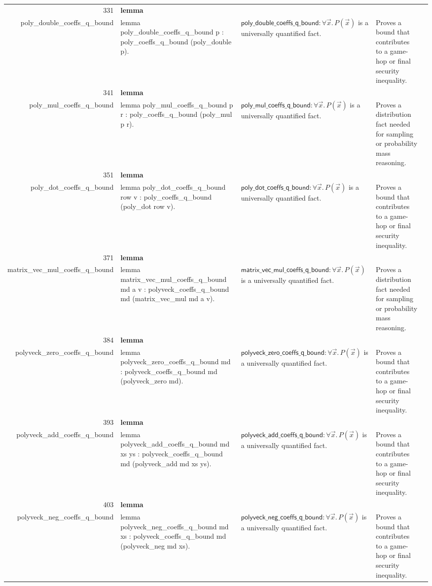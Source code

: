 \documentclass[10pt]{article}
\newcommand{\ec}[1]{\begingroup\ttfamily\scriptsize #1\endgroup}
\begin{document}
\begin{longtable}{r L{0.17\textwidth} L{0.26\textwidth} L{0.27\textwidth} L{0.20\textwidth}}
331 & \textbf{lemma}\\\ec{poly\_double\_coeffs\_q\_bound} & \ec{lemma poly\_double\_coeffs\_q\_bound p : poly\_coeffs\_q\_bound (poly\_double p).} & \(\mathsf{poly\_double\_coeffs\_q\_bound} : \forall \vec{x}.\, P(\vec{x})\) is a universally quantified fact. & Proves a bound that contributes to a game-hop or final security inequality. \\
341 & \textbf{lemma}\\\ec{poly\_mul\_coeffs\_q\_bound} & \ec{lemma poly\_mul\_coeffs\_q\_bound p r : poly\_coeffs\_q\_bound (poly\_mul p r).} & \(\mathsf{poly\_mul\_coeffs\_q\_bound} : \forall \vec{x}.\, P(\vec{x})\) is a universally quantified fact. & Proves a distribution fact needed for sampling or probability mass reasoning. \\
351 & \textbf{lemma}\\\ec{poly\_dot\_coeffs\_q\_bound} & \ec{lemma poly\_dot\_coeffs\_q\_bound row v : poly\_coeffs\_q\_bound (poly\_dot row v).} & \(\mathsf{poly\_dot\_coeffs\_q\_bound} : \forall \vec{x}.\, P(\vec{x})\) is a universally quantified fact. & Proves a bound that contributes to a game-hop or final security inequality. \\
371 & \textbf{lemma}\\\ec{matrix\_vec\_mul\_coeffs\_q\_bound} & \ec{lemma matrix\_vec\_mul\_coeffs\_q\_bound md a v : polyveck\_coeffs\_q\_bound md (matrix\_vec\_mul md a v).} & \(\mathsf{matrix\_vec\_mul\_coeffs\_q\_bound} : \forall \vec{x}.\, P(\vec{x})\) is a universally quantified fact. & Proves a distribution fact needed for sampling or probability mass reasoning. \\
384 & \textbf{lemma}\\\ec{polyveck\_zero\_coeffs\_q\_bound} & \ec{lemma polyveck\_zero\_coeffs\_q\_bound md : polyveck\_coeffs\_q\_bound md (polyveck\_zero md).} & \(\mathsf{polyveck\_zero\_coeffs\_q\_bound} : \forall \vec{x}.\, P(\vec{x})\) is a universally quantified fact. & Proves a bound that contributes to a game-hop or final security inequality. \\
393 & \textbf{lemma}\\\ec{polyveck\_add\_coeffs\_q\_bound} & \ec{lemma polyveck\_add\_coeffs\_q\_bound md xs ys : polyveck\_coeffs\_q\_bound md (polyveck\_add md xs ys).} & \(\mathsf{polyveck\_add\_coeffs\_q\_bound} : \forall \vec{x}.\, P(\vec{x})\) is a universally quantified fact. & Proves a bound that contributes to a game-hop or final security inequality. \\
403 & \textbf{lemma}\\\ec{polyveck\_neg\_coeffs\_q\_bound} & \ec{lemma polyveck\_neg\_coeffs\_q\_bound md xs : polyveck\_coeffs\_q\_bound md (polyveck\_neg md xs).} & \(\mathsf{polyveck\_neg\_coeffs\_q\_bound} : \forall \vec{x}.\, P(\vec{x})\) is a universally quantified fact. & Proves a bound that contributes to a game-hop or final security inequality. \\

\end{longtable}
\end{document}
